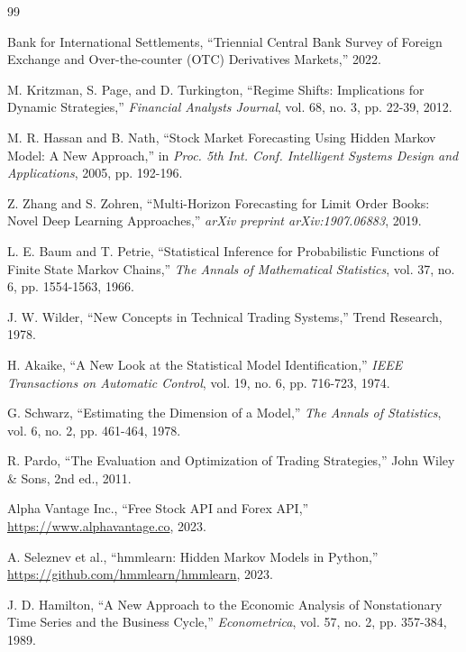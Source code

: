 \documentclass[conference]{IEEEtran}
\begin{document}
\begin{thebibliography}{99}

Bank for International Settlements, ``Triennial Central Bank Survey of Foreign Exchange and Over-the-counter (OTC) Derivatives Markets,'' 2022.

M. Kritzman, S. Page, and D. Turkington, ``Regime Shifts: Implications for Dynamic Strategies,'' \textit{Financial Analysts Journal}, vol. 68, no. 3, pp. 22-39, 2012.

M. R. Hassan and B. Nath, ``Stock Market Forecasting Using Hidden Markov Model: A New Approach,'' in \textit{Proc. 5th Int. Conf. Intelligent Systems Design and Applications}, 2005, pp. 192-196.

Z. Zhang and S. Zohren, ``Multi-Horizon Forecasting for Limit Order Books: Novel Deep Learning Approaches,'' \textit{arXiv preprint arXiv:1907.06883}, 2019.

L. E. Baum and T. Petrie, ``Statistical Inference for Probabilistic Functions of Finite State Markov Chains,'' \textit{The Annals of Mathematical Statistics}, vol. 37, no. 6, pp. 1554-1563, 1966.

J. W. Wilder, ``New Concepts in Technical Trading Systems,'' Trend Research, 1978.

H. Akaike, ``A New Look at the Statistical Model Identification,'' \textit{IEEE Transactions on Automatic Control}, vol. 19, no. 6, pp. 716-723, 1974.

G. Schwarz, ``Estimating the Dimension of a Model,'' \textit{The Annals of Statistics}, vol. 6, no. 2, pp. 461-464, 1978.

R. Pardo, ``The Evaluation and Optimization of Trading Strategies,'' John Wiley \& Sons, 2nd ed., 2011.

Alpha Vantage Inc., ``Free Stock API and Forex API,'' \url{https://www.alphavantage.co}, 2023.

A. Seleznev et al., ``hmmlearn: Hidden Markov Models in Python,'' \url{https://github.com/hmmlearn/hmmlearn}, 2023.

J. D. Hamilton, ``A New Approach to the Economic Analysis of Nonstationary Time Series and the Business Cycle,'' \textit{Econometrica}, vol. 57, no. 2, pp. 357-384, 1989.

\end{thebibliography}
\end{document}

